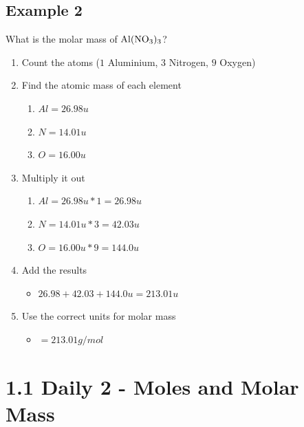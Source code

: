 \documentclass{scrartcl}
\begin{document}
\subsection{Example 2}
\label{sec:org70b76e3}
What is the molar mass of \(\ce{Al(NO3)3}\)?
\begin{enumerate}
\item Count the atoms (\(1\) Aluminium, \(3\) Nitrogen, \(9\) Oxygen)
\item Find the atomic mass of each element 
\begin{enumerate}
\item \(Al = 26.98u\)
\item \(N = 14.01u\)
\item \(O = 16.00u\)
\end{enumerate}
\item Multiply it out 
\begin{enumerate}
\item \(Al = 26.98u * 1 = 26.98u\)
\item \(N = 14.01u * 3 = 42.03u\)
\item \(O = 16.00u * 9 = 144.0u\)
\end{enumerate}
\item Add the results
\begin{itemize}
\item \(26.98 + 42.03 + 144.0u = 213.01u\)
\end{itemize}
\item Use the correct units for molar mass 
\begin{itemize}
\item \(= 213.01 g/mol\)
\end{itemize}
\end{enumerate}

\section{1.1 Daily 2 - Moles and Molar Mass}
\label{sec:orgd56c3a7}
\end{document}
